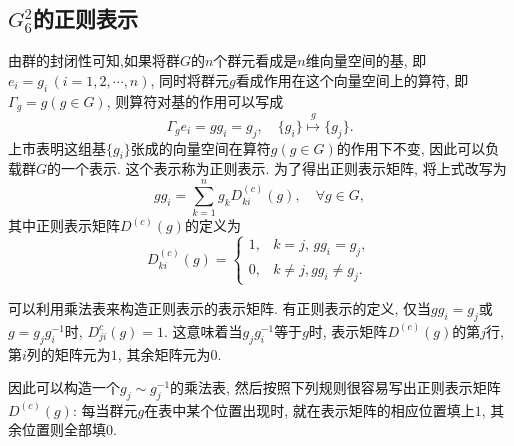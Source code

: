 \documentclass[UTF8]{ctexart}
\begin{document}
\subsection{$G_6^2$的正则表示}
由群的封闭性可知,如果将群$G$的$n$个群元看成是$n$维向量空间的基, 即$e_i = g_i \, (i = 1, 2, \cdots, n)$, 同时将群元$g$看成作用在这个向量空间上的算符, 即$\varGamma_g = g (g \in G)$, 则算符对基的作用可以写成
\begin{equation}
  \varGamma_g e_i = g g_i = g_j, \quad \{g_i\} \stackrel{g}{\mapsto} \{g_j\}.
\end{equation}
上市表明这组基$\{g_i\}$张成的向量空间在算符$g(g \in G)$的作用下不变, 因此可以负载群$G$的一个表示. 这个表示称为正则表示. 为了得出正则表示矩阵, 将上式改写为
\begin{equation}
  gg_i = \sum_{k = 1}^{n} g_k D_{ki}^{(c)} (g), \quad \forall g \in G,
\end{equation}
其中正则表示矩阵$D^{(c)}(g)$的定义为
\begin{equation}
  D_{ki}^{(c)} (g) =
  \begin{cases}
    1, & k = j, \, gg_i = g_j,\\
    0, & k \neq j, gg_i \neq g_j.
  \end{cases}
\end{equation}

可以利用乘法表来构造正则表示的表示矩阵. 有正则表示的定义, 仅当$gg_i = g_j$或$g = g_j g_i^{-1}$时, $D_{ji}^{c} (g) = 1$. 这意味着当$g_j g_i^{-1}$等于$g$时, 表示矩阵$D^{(c)}(g)$的第$j$行, 第$i$列的矩阵元为$1$, 其余矩阵元为$0$.

因此可以构造一个$g_j \sim g_j^{-1}$的乘法表, 然后按照下列规则很容易写出正则表示矩阵$D^{(c)}(g)$: 每当群元$g$在表中某个位置出现时, 就在表示矩阵的相应位置填上$1$, 其余位置则全部填$0$.
\end{document}

